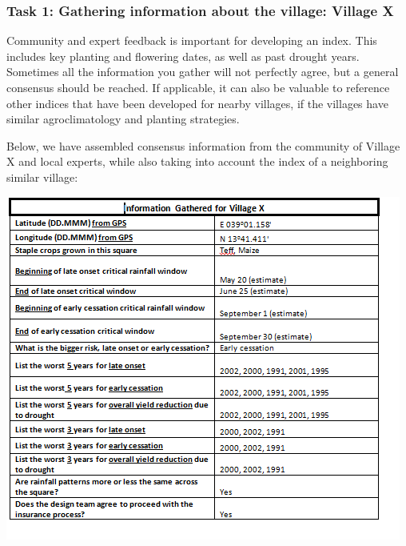 \documentclass[letterpaper,10pt,english]{sphinxmanual}
\begin{document}
\subsubsection{Task 1: Gathering information about the village: Village X}
\label{whatisindexinsurance/designingindexbyhand:task-1-gathering-information-about-the-village-village-x}
Community and expert feedback is important for developing an index. This includes key planting and flowering dates, as well as past drought years. Sometimes all the information you gather will not perfectly agree, but a general consensus should be reached. If applicable, it can also be valuable to reference other indices that have been developed for nearby villages, if the villages have similar agroclimatology and planting strategies.

Below, we have assembled consensus information from the community of Village X and local experts, while also taking into account the index of a neighboring similar village:

{\hfill\includegraphics{villagex.png}\hfill}
\end{document}
